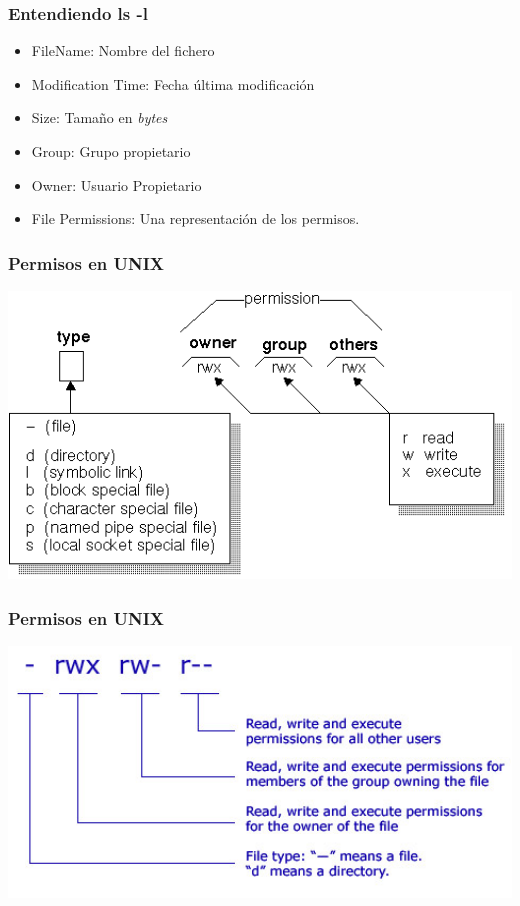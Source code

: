 \documentclass[colorlinks,10pt]{beamer}
\begin{document}
\begin{frame}
  \frametitle{Entendiendo ls -l}
  \begin{itemize}
  \item FileName: Nombre del fichero
  \item Modification Time: Fecha última modificación
  \item Size: Tamaño en \emph{bytes}
  \item Group: Grupo propietario 
  \item Owner: Usuario Propietario 
  \item File Permissions: Una representación de los permisos. 
  \end{itemize}
\end{frame}




\begin{frame}
  \frametitle{Permisos en UNIX}
    \begin{center}
    \includegraphics[width=1\textwidth]{figs/permissions} 
  \end{center} 
\end{frame}


\begin{frame}
  \frametitle{Permisos en UNIX}
    \begin{center}
    \includegraphics[width=1\textwidth]{figs/permissions0} 
  \end{center} 
\end{frame}
\end{document}
